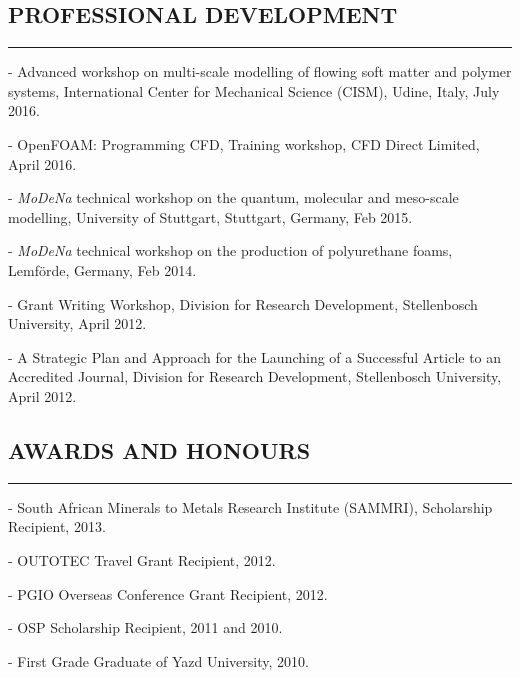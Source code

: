 \documentclass[10pt,a4]{article}
\begin{document}
\begin{small}
\subsection*{PROFESSIONAL DEVELOPMENT}
\hrule
\vspace{0.2cm}
\begin{list}{}{}

	\item - Advanced workshop on multi-scale modelling of flowing soft matter and polymer systems, International Center for Mechanical Science (CISM), Udine, Italy, July 2016.
	\item - OpenFOAM: Programming CFD, Training workshop, CFD Direct Limited, April 2016.
	\item - \textit{MoDeNa} technical workshop on the quantum, molecular and meso-scale modelling, University of Stuttgart, Stuttgart, Germany, Feb 2015.	

	\item - \textit{MoDeNa} technical workshop on the production of polyurethane foams, Lemf\"{o}rde, Germany, Feb 2014.

	\item - Grant Writing Workshop, Division for Research Development, Stellenbosch University, April 2012.

	\item - A Strategic Plan and Approach for the Launching of a Successful Article to an Accredited Journal, Division for Research Development, Stellenbosch University, April 2012.
\end{list}

\thispagestyle{fancy}
\rfoot{\textcolor{gray}{Page \thepage}}
\fancyfoot[C]{}

\subsection*{AWARDS AND HONOURS}
\hrule
\vspace{0.2cm}
\begin{list}{}{}
	\item - South African Minerals to Metals Research Institute (SAMMRI), Scholarship Recipient, 2013.
	\item - OUTOTEC Travel Grant Recipient, 2012.
	\item - PGIO Overseas Conference Grant Recipient, 2012.
	\item - OSP Scholarship Recipient, 2011 and 2010.
	\item - First Grade Graduate of Yazd University, 2010.
\end{list}


\end{small}
\end{document}
